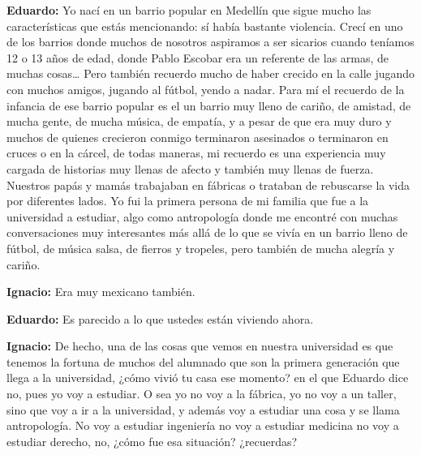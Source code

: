 \documentclass[
]{interact}
\begin{document}
\textbf{Eduardo:} Yo nací en un barrio popular en Medellín que sigue
mucho las características que estás mencionando: sí había bastante
violencia. Crecí en uno de los barrios donde muchos de nosotros
aspiramos a ser sicarios cuando teníamos 12 o 13 años de edad, donde
Pablo Escobar era un referente de las armas, de muchas cosas\ldots{}
Pero también recuerdo mucho de haber crecido en la calle jugando con
muchos amigos, jugando al fútbol, yendo a nadar. Para mí el recuerdo de
la infancia de ese barrio popular es el un barrio muy lleno de cariño,
de amistad, de mucha gente, de mucha música, de empatía, y a pesar de
que era muy duro y muchos de quienes crecieron conmigo terminaron
asesinados o terminaron en cruces o en la cárcel, de todas maneras, mi
recuerdo es una experiencia muy cargada de historias muy llenas de
afecto y también muy llenas de fuerza. Nuestros papás y mamás trabajaban
en fábricas o trataban de rebuscarse la vida por diferentes lados. Yo
fui la primera persona de mi familia que fue a la universidad a
estudiar, algo como antropología donde me encontré con muchas
conversaciones muy interesantes más allá de lo que se vivía en un barrio
lleno de fútbol, de música salsa, de fierros y tropeles, pero también de
mucha alegría y cariño.

\textbf{Ignacio:} Era muy mexicano también.

\textbf{Eduardo:} Es parecido a lo que ustedes están viviendo ahora.

\textbf{Ignacio:} De hecho, una de las cosas que vemos en nuestra
universidad es que tenemos la fortuna de muchos del alumnado que son la
primera generación que llega a la universidad, ¿cómo vivió tu casa ese
momento? en el que Eduardo dice no, pues yo voy a estudiar. O sea yo no
voy a la fábrica, yo no voy a un taller, sino que voy a ir a la
universidad, y además voy a estudiar una cosa y se llama antropología.
No voy a estudiar ingeniería no voy a estudiar medicina no voy a
estudiar derecho, no, ¿cómo fue esa situación? ¿recuerdas?
\end{document}
